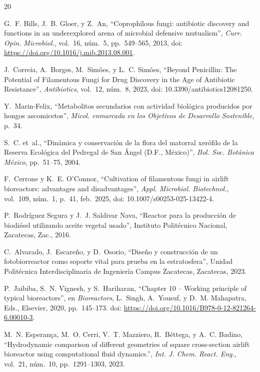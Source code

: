 \documentclass[11pt,tesis,twoside,openright,spanish]{upiiztt}
\begin{document}
\begin{thebibliography}{20}

G.~F. Bills, J.~B. Gloer, y Z.~An, ``Coprophilous fungi: antibiotic discovery and functions in an underexplored arena of microbial defensive mutualism'', \textit{Curr. Opin. Microbiol.}, vol.~16, núm.~5, pp.~549--565, 2013, doi: \url{https://doi.org/10.1016/j.mib.2013.08.001}.

J.~Correia, A.~Borges, M.~Simões, y L.~C. Simões, ``Beyond Penicillin: The Potential of Filamentous Fungi for Drug Discovery in the Age of Antibiotic Resistance'', \textit{Antibiotics}, vol.~12, núm.~8, 2023, doi: 10.3390/antibiotics12081250.

Y.~Marin-Felix, ``Metabolitos secundarios con actividad biológica producidos por hongos ascomicetos'', \textit{Micol. enmarcada en los Objetivos de Desarrollo Sostenible}, p.~34.

S.~C. et~al., ``Dinámica y conservación de la flora del matorral xerófilo de la Reserva Ecológica del Pedregal de San Ángel (D.F., México)'', \textit{Bol. Soc. Botánica México}, pp.~51--75, 2004.

F.~Cerrone y K.~E. O'Connor, ``Cultivation of filamentous fungi in airlift bioreactors: advantages and disadvantages'', \textit{Appl. Microbiol. Biotechnol.}, vol.~109, núm.~1, p.~41, feb.~2025, doi: 10.1007/s00253-025-13422-4.

P.~Rodríguez Segura y J.~J. Saldivar Nava, ``Reactor para la producción de biodiésel utilizando aceite vegetal usado'', Instituto Politécnico Nacional, Zacatecas, Zac., 2016.

C.~Alvarado, J.~Escareño, y D.~Osorio, ``Diseño y construcción de un fotobiorreactor como soporte vital para prueba en la estratosfera'', Unidad Politécnica Interdisciplinaria de Ingeniería Campus Zacatecas, Zacatecas, 2023.

P.~Jaibiba, S.~N. Vignesh, y S.~Hariharan, ``Chapter 10 -- Working principle of typical bioreactors'', en \textit{Bioreactors}, L.~Singh, A.~Yousuf, y D.~M. Mahapatra, Eds., Elsevier, 2020, pp.~145--173. doi: \url{https://doi.org/10.1016/B978-0-12-821264-6.00010-3}.

M.~N. Esperança, M.~O. Cerri, V.~T. Mazziero, R.~Béttega, y A.~C. Badino, ``Hydrodynamic comparison of different geometries of square cross-section airlift bioreactor using computational fluid dynamics.'', \textit{Int. J. Chem. React. Eng.}, vol.~21, núm.~10, pp.~1291--1303, 2023.


\end{thebibliography}
\end{document}
